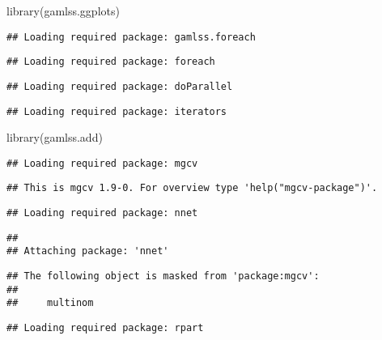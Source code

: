 \documentclass[
]{article}
\newenvironment{Shaded}{\begin{snugshade}}{\end{snugshade}}
\newcommand{\FunctionTok}[1]{\textcolor[rgb]{0.00,0.00,0.00}{#1}}
\newcommand{\NormalTok}[1]{#1}
\begin{document}
\begin{Shaded}
\begin{Highlighting}[]
\FunctionTok{library}\NormalTok{(gamlss.ggplots)}
\end{Highlighting}
\end{Shaded}

\begin{verbatim}
## Loading required package: gamlss.foreach
\end{verbatim}

\begin{verbatim}
## Loading required package: foreach
\end{verbatim}

\begin{verbatim}
## Loading required package: doParallel
\end{verbatim}

\begin{verbatim}
## Loading required package: iterators
\end{verbatim}

\begin{Shaded}
\begin{Highlighting}[]
\FunctionTok{library}\NormalTok{(gamlss.add)}
\end{Highlighting}
\end{Shaded}

\begin{verbatim}
## Loading required package: mgcv
\end{verbatim}

\begin{verbatim}
## This is mgcv 1.9-0. For overview type 'help("mgcv-package")'.
\end{verbatim}

\begin{verbatim}
## Loading required package: nnet
\end{verbatim}

\begin{verbatim}
## 
## Attaching package: 'nnet'
\end{verbatim}

\begin{verbatim}
## The following object is masked from 'package:mgcv':
## 
##     multinom
\end{verbatim}

\begin{verbatim}
## Loading required package: rpart
\end{verbatim}
\end{document}
